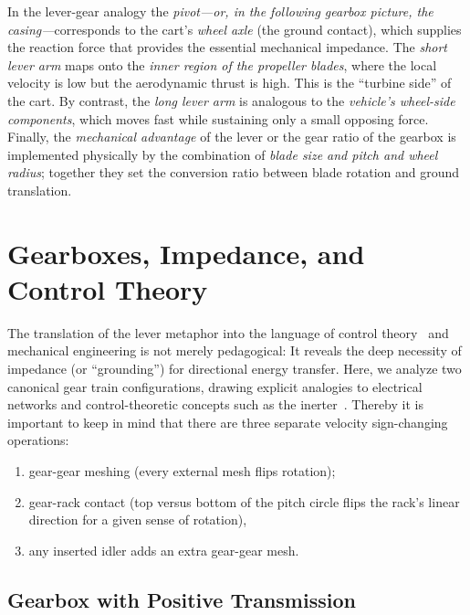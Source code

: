 \documentclass[reprint,aps,pra,superscriptaddress,longbibliography]{revtex4-2}
\begin{document}
In the lever-gear analogy the \emph{pivot---or, in the following gearbox picture, the
casing---}corresponds to the cart's \emph{wheel axle} (the ground contact),
which supplies the reaction force that provides the essential mechanical
impedance. The \emph{short lever arm} maps onto the \emph{inner region of the
propeller blades}, where the local velocity is low but the aerodynamic thrust
is high. This is the ``turbine side'' of the cart. By contrast, the
\emph{long lever arm} is analogous to the \emph{vehicle's wheel-side components},
which moves fast while sustaining only a small opposing force. Finally, the
\emph{mechanical advantage} of the lever or the gear ratio of the gearbox is
implemented physically by the combination of \emph{blade size and pitch and wheel
radius}; together they set the conversion ratio between blade rotation and
ground translation.

\section{Gearboxes, Impedance, and Control Theory}

The translation of the lever metaphor into the language of control theory~\cite{bechhoefer-2021} and mechanical engineering is not merely pedagogical:
It reveals the deep necessity of impedance (or ``grounding'') for directional energy transfer. Here,
we analyze two canonical gear train configurations, drawing explicit analogies to electrical networks and control-theoretic concepts such as the inerter~\cite{Smith2002}.
Thereby it is important to keep in mind that there are three separate velocity sign-changing operations:
\begin{enumerate}
    \item gear-gear meshing (every external mesh flips rotation);
    \item gear-rack contact (top versus bottom of the pitch circle flips the rack's linear direction for a given sense of rotation),
    \item any inserted idler adds an extra gear-gear mesh.
\end{enumerate}

\subsection{Gearbox with Positive Transmission}
\end{document}
